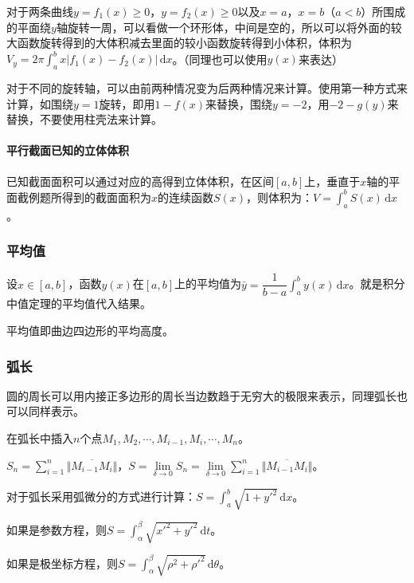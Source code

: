 \documentclass[UTF8, 12pt]{ctexart}
\begin{document}
        对于两条曲线$y=f_1(x)\geqslant0$，$y=f_2(x)\geqslant0$以及$x=a$，$x=b$（$a<b$）所围成的平面绕$y$轴旋转一周，可以看做一个环形体，中间是空的，所以可以将外面的较大函数旋转得到的大体积减去里面的较小函数旋转得到小体积，体积为$V_y=2\pi\int_a^bx\vert f_1(x)-f_2(x)\vert\,\textrm{d}x$。（同理也可以使用$y(x)$来表达）

        对于不同的旋转轴，可以由前两种情况变为后两种情况来计算。使用第一种方式来计算，如围绕$y=1$旋转，即用$1-f(x)$来替换，围绕$y=-2$，用$-2-g(y)$来替换，不要使用柱壳法来计算。

        \paragraph{平行截面已知的立体体积} \leavevmode \medskip

        已知截面面积可以通过对应的高得到立体体积，在区间$[a,b]$上，垂直于$x$轴的平面截例题所得到的截面面积为$x$的连续函数$S(x)$，则体积为：$V=\int_a^bS(x)\,\textrm{d}x$。

        \subsubsection{平均值}

        设$x\in[a,b]$，函数$y(x)$在$[a,b]$上的平均值为$\bar{y}=\dfrac{1}{b-a}\int_a^by(x)\,\textrm{d}x$。就是积分中值定理的平均值代入结果。

        平均值即曲边四边形的平均高度。

        \subsubsection{弧长}

        圆的周长可以用内接正多边形的周长当边数趋于无穷大的极限来表示，同理弧长也可以同样表示。

        在弧长中插入$n$个点$M_1,M_2,\cdots,M_{i-1},M_i,\cdots,M_n$。

        $S_n=\sum\limits_{i=1}^n\Vert\overline{M_{i-1}M_{i}}\Vert$，$S=\lim\limits_{\delta\to 0}S_n=\lim\limits_{\delta\to 0}\sum\limits_{i=1}^n\Vert\overline{M_{i-1}M_{i}}\Vert$。

        对于弧长采用弧微分的方式进行计算：$S=\int_a^b\sqrt{1+y'^2}\,\textrm{d}x$。

        如果是参数方程，则$S=\int_\alpha^\beta\sqrt{x'^2+y'^2}\,\textrm{d}t$。

        如果是极坐标方程，则$S=\int_\alpha^\beta\sqrt{\rho^2+\rho'^2}\,\textrm{d}\theta$。
\end{document}
